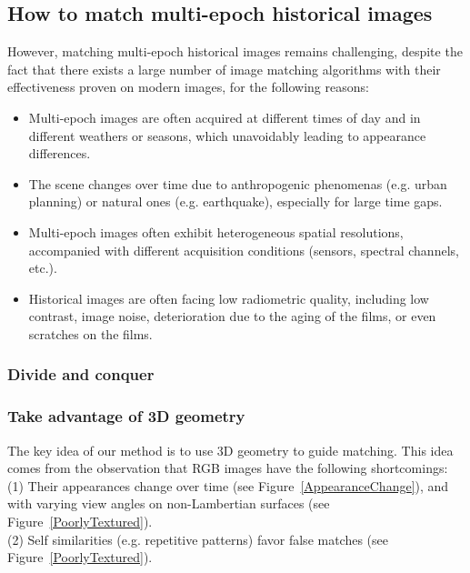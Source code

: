 \subsection{How to match multi-epoch historical images}
However, matching multi-epoch historical images remains challenging, despite the fact that there exists a large number of image matching algorithms with their effectiveness proven on modern images, for the following reasons:
\begin{itemize}
	\item Multi-epoch images are often acquired at different times of day and in different weathers or seasons, which unavoidably leading to appearance differences.
	\item The scene changes over time due to anthropogenic phenomenas (e.g. urban planning) or natural ones (e.g. earthquake), especially for large time gaps.
	\item Multi-epoch images often exhibit heterogeneous spatial resolutions, accompanied with different acquisition conditions (sensors, spectral channels, etc.).
	\item Historical images are often facing low radiometric quality, including low contrast, image noise, deterioration due to the aging of the films, or even scratches on the films.
\end{itemize}
\subsubsection{Divide and conquer}
\subsubsection{Take advantage of 3D geometry}
The key idea of our method is to use 3D geometry to guide matching. This idea comes from the observation that RGB images have the following shortcomings:\\
(1) Their appearances change over time (see Figure~\ref{AppearanceChange}), and with varying view angles on non-Lambertian surfaces (see Figure~\ref{PoorlyTextured}).\\
(2) Self similarities (e.g. repetitive patterns) favor false matches (see Figure~\ref{PoorlyTextured}).\\

